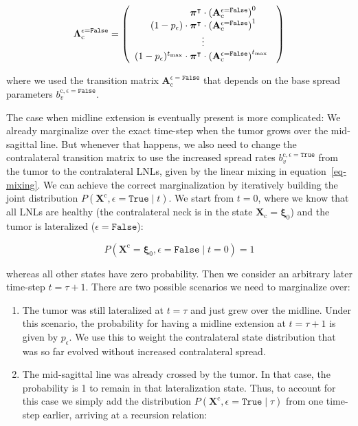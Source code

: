\documentclass[
  sn-mathphys-num,
]{sn-jnl}
\providecommand{\tightlist}{%
  \setlength{\itemsep}{0pt}\setlength{\parskip}{0pt}}\usepackage{longtable,booktabs,array}
\begin{document}
\[
\boldsymbol{\Lambda}_\text{c}^{\epsilon=\texttt{False}} =
\left(
\begin{array}{r}
\boldsymbol{\pi}^\intercal \cdot \left( \mathbf{A}_\text{c}^{\epsilon=\texttt{False}} \right)^{0\phantom{t_\text{max}}} \\
(1-p_\epsilon) \cdot \boldsymbol{\pi}^\intercal \cdot \left( \mathbf{A}_\text{c}^{\epsilon=\texttt{False}} \right)^{1\phantom{t_\text{max}}} \\
\hfill \vdots \hfill \\
(1-p_\epsilon)^{t_\text{max}} \cdot \boldsymbol{\pi}^\intercal \cdot \left( \mathbf{A}_\text{c}^{\epsilon=\texttt{False}} \right)^{t_\text{max}\phantom{0}} \\
\end{array}
\right)
\]

where we used the transition matrix
\(\mathbf{A}_\text{c}^{\epsilon=\texttt{False}}\) that depends on the
base spread parameters \(b_v^{\text{c},\epsilon=\texttt{False}}\).

The case when midline extension is eventually present is more
complicated: We already marginalize over the exact time-step when the
tumor grows over the mid-sagittal line. But whenever that happens, we
also need to change the contralateral transition matrix to use the
increased spread rates \(b_v^{\text{c}, \epsilon=\texttt{True}}\) from
the tumor to the contralateral LNLs, given by the linear mixing in
equation~\ref{eq-mixing}. We can achieve the correct marginalization by
iteratively building the joint distribution
\(P \left( \mathbf{X}^\text{c}, \epsilon=\texttt{True} \mid t \right)\).
We start from \(t=0\), where we know that all LNLs are healthy (the
contralateral neck is in the state
\(\mathbf{X}_\text{c}=\boldsymbol{\xi}_0\)) and the tumor is lateralized
(\(\epsilon=\texttt{False}\)):

\[
P \left( \mathbf{X}^\text{c} = \boldsymbol{\xi}_0, \epsilon=\texttt{False} \mid t=0 \right) = 1
\]

whereas all other states have zero probability. Then we consider an
arbitrary later time-step \(t=\tau+1\). There are two possible scenarios
we need to marginalize over:

\begin{enumerate}
\def\labelenumi{\arabic{enumi}.}
\tightlist
\item
  The tumor was still lateralized at \(t=\tau\) and just grew over the
  midline. Under this scenario, the probability for having a midline
  extension at \(t=\tau+1\) is given by \(p_\epsilon\). We use this to
  weight the contralateral state distribution that was so far evolved
  without increased contralateral spread.
\item
  The mid-sagittal line was already crossed by the tumor. In that case,
  the probability is 1 to remain in that lateralization state. Thus, to
  account for this case we simply add the distribution
  \(P\left( \mathbf{X}^\text{c}, \epsilon=\texttt{True} \mid \tau \right)\)
  from one time-step earlier, arriving at a recursion relation:
\end{enumerate}
\end{document}
